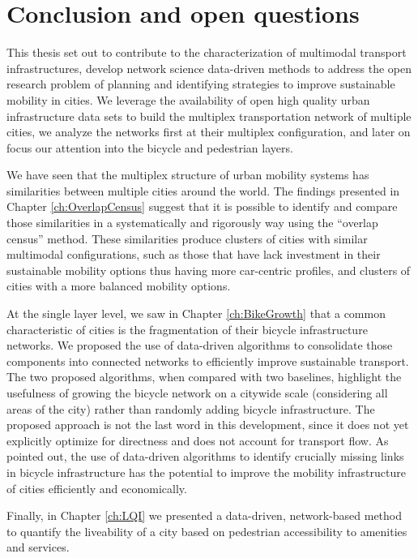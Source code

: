 \chapter{Conclusion and open questions}\label{ch:Conclusion}

This thesis set out to contribute to the characterization of multimodal transport infrastructures, develop network science data-driven methods to address the open research problem of planning and identifying strategies to improve sustainable mobility in cities. We leverage the availability of open high quality urban infrastructure data sets to build the multiplex transportation network of multiple cities, we analyze the networks first at their multiplex configuration, and later on focus our attention into the bicycle and pedestrian layers.

We have seen that the multiplex structure of urban mobility systems has similarities between multiple cities around the world. The findings presented in Chapter \ref{ch:OverlapCensus} suggest that it is possible to identify and compare those similarities in a systematically and rigorously way using the ``overlap census'' method. These similarities produce clusters of cities with similar multimodal configurations, such as those that have lack investment in their sustainable mobility options thus having more car-centric profiles, and clusters of cities with a more balanced mobility options.

At the single layer level, we saw in Chapter \ref{ch:BikeGrowth} that a common characteristic of cities is the fragmentation of their bicycle infrastructure networks. We proposed the use of data-driven algorithms to consolidate those components into connected networks to efficiently improve sustainable transport. The two proposed algorithms, when compared with two baselines, highlight the usefulness of growing the bicycle network on a citywide scale (considering all areas of the city) rather than randomly adding bicycle infrastructure. The proposed approach is not the last word in this development, since it does not yet explicitly optimize for directness and does not account for transport flow. As pointed out, the use of data-driven algorithms to identify crucially missing links in bicycle infrastructure has the potential to improve the mobility infrastructure of cities efficiently and economically.

Finally, in Chapter \ref{ch:LQI} we presented a data-driven, network-based method to quantify the liveability of a city based on pedestrian accessibility to amenities and services.

